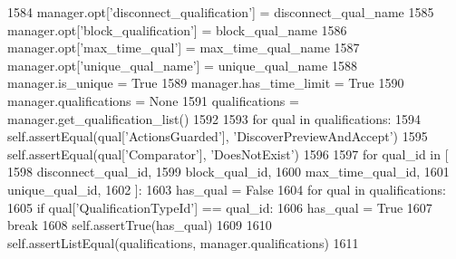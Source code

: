 \begin{DoxyCode}
1584         manager.opt[\textcolor{stringliteral}{'disconnect\_qualification'}] = disconnect\_qual\_name
1585         manager.opt[\textcolor{stringliteral}{'block\_qualification'}] = block\_qual\_name
1586         manager.opt[\textcolor{stringliteral}{'max\_time\_qual'}] = max\_time\_qual\_name
1587         manager.opt[\textcolor{stringliteral}{'unique\_qual\_name'}] = unique\_qual\_name
1588         manager.is\_unique = \textcolor{keyword}{True}
1589         manager.has\_time\_limit = \textcolor{keyword}{True}
1590         manager.qualifications = \textcolor{keywordtype}{None}
1591         qualifications = manager.get\_qualification\_list()
1592 
1593         \textcolor{keywordflow}{for} qual \textcolor{keywordflow}{in} qualifications:
1594             self.assertEqual(qual[\textcolor{stringliteral}{'ActionsGuarded'}], \textcolor{stringliteral}{'DiscoverPreviewAndAccept'})
1595             self.assertEqual(qual[\textcolor{stringliteral}{'Comparator'}], \textcolor{stringliteral}{'DoesNotExist'})
1596 
1597         \textcolor{keywordflow}{for} qual\_id \textcolor{keywordflow}{in} [
1598             disconnect\_qual\_id,
1599             block\_qual\_id,
1600             max\_time\_qual\_id,
1601             unique\_qual\_id,
1602         ]:
1603             has\_qual = \textcolor{keyword}{False}
1604             \textcolor{keywordflow}{for} qual \textcolor{keywordflow}{in} qualifications:
1605                 \textcolor{keywordflow}{if} qual[\textcolor{stringliteral}{'QualificationTypeId'}] == qual\_id:
1606                     has\_qual = \textcolor{keyword}{True}
1607                     \textcolor{keywordflow}{break}
1608             self.assertTrue(has\_qual)
1609 
1610         self.assertListEqual(qualifications, manager.qualifications)
1611 
\end{DoxyCode}
\mbox{\label{classparlai_1_1mturk_1_1core_1_1test_1_1test__mturk__manager_1_1TestMTurkManagerConnectedFunctions_a278857870f1d9af0b31c45955d10b466}} 
